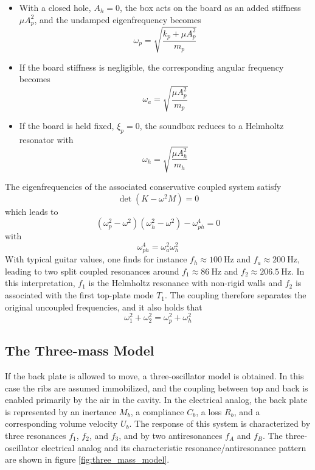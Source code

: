 \begin{itemize}
    \item With a closed hole, \( A_h = 0 \), the box acts on the board as an added stiffness \( \mu A_p^{2} \), and the undamped eigenfrequency becomes
    \[
    \omega_p = \sqrt{\frac{k_p + \mu A_p^{2}}{m_p}}
    \]
    \item If the board stiffness is negligible, the corresponding angular frequency becomes
    \[
    \omega_a = \sqrt{\frac{\mu A_p^{2}}{m_p}}
    \]
    \item If the board is held fixed, \( \xi_p = 0 \), the soundbox reduces to a Helmholtz resonator with
    \[
    \omega_h = \sqrt{\frac{\mu A_h^{2}}{m_h}}
    \]
\end{itemize}

The eigenfrequencies of the associated conservative coupled system satisfy
\[
\det\left(K - \omega^{2}M\right)=0
\]
which leads to
\[
\left(\omega_p^{2}-\omega^{2}\right)\left(\omega_h^{2}-\omega^{2}\right)-\omega_{ph}^{4}=0
\]
with
\[
\omega_{ph}^{4}=\omega_a^{2}\omega_h^{2}
\]
With typical guitar values, one finds for instance \( f_h \approx \SI{100}{\hertz} \) and \( f_a \approx \SI{200}{\hertz} \), leading to two split coupled resonances around \( f_1 \approx \SI{86}{\hertz} \) and \( f_2 \approx \SI{206.5}{\hertz} \). In this interpretation, \( f_1 \) is the Helmholtz resonance with non-rigid walls and \( f_2 \) is associated with the first top-plate mode \( T_1 \). The coupling therefore separates the original uncoupled frequencies, and it also holds that
\[
\omega_1^{2}+\omega_2^{2}=\omega_p^{2}+\omega_h^{2}
\]

\subsection{The Three-mass Model}

If the back plate is allowed to move, a three-oscillator model is obtained. In this case the ribs are assumed immobilized, and the coupling between top and back is enabled primarily by the air in the cavity. In the electrical analog, the back plate is represented by an inertance \( M_b \), a compliance \( C_b \), a loss \( R_b \), and a corresponding volume velocity \( U_b \). The response of this system is characterized by three resonances \( f_1 \), \( f_2 \), and \( f_3 \), and by two antiresonances \( f_A \) and \( f_B \). The three-oscillator electrical analog and its characteristic resonance/antiresonance pattern are shown in figure \ref{fig:three_mass_model}.

